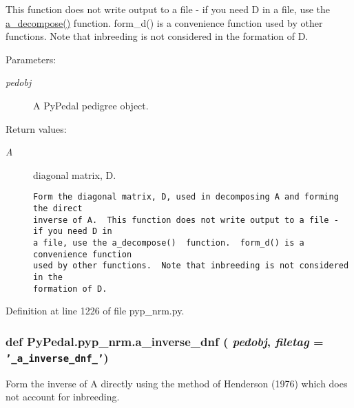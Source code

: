 This function does not write output to a file - if you need D in a file, use the \hyperlink{namespacePyPedal_1_1pyp__nrm_1f381e4601f9cbfec699bc2b293fc5eb}{a\_\-decompose()} function. form\_\-d() is a convenience function used by other functions. Note that inbreeding is not considered in the formation of D. \begin{Desc}
\item[Parameters:]
\begin{description}
\item[{\em pedobj}]A Py\-Pedal pedigree object. \end{description}
\end{Desc}
\begin{Desc}
\item[Return values:]
\begin{description}
\item[{\em A}]diagonal matrix, D.

\footnotesize\begin{verbatim}Form the diagonal matrix, D, used in decomposing A and forming the direct
inverse of A.  This function does not write output to a file - if you need D in
a file, use the a_decompose()  function.  form_d() is a convenience function
used by other functions.  Note that inbreeding is not considered in the
formation of D.
\end{verbatim}
\normalsize
 \end{description}
\end{Desc}


Definition at line 1226 of file pyp\_\-nrm.py.\hypertarget{namespacePyPedal_1_1pyp__nrm_9c6e5cd761d3de4d0501e0fa9c8b2977}{
\subsubsection[a\_\-inverse\_\-dnf]{\setlength{\rightskip}{0pt plus 5cm}def Py\-Pedal.pyp\_\-nrm.a\_\-inverse\_\-dnf ( {\em pedobj},  {\em filetag} = {\tt '\_\-a\_\-inverse\_\-dnf\_\-'})}}
\label{namespacePyPedal_1_1pyp__nrm_9c6e5cd761d3de4d0501e0fa9c8b2977}


Form the inverse of A directly using the method of Henderson (1976) which does not account for inbreeding. 

